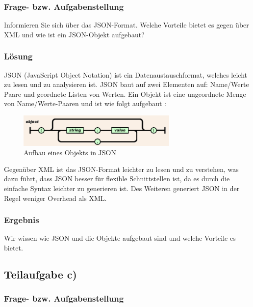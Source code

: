 \subsubsection{Frage- bzw. Aufgabenstellung}

Informieren Sie sich über das JSON-Format. Welche Vorteile bietet es gegen über XML und wie ist ein JSON-Objekt aufgebaut?

\subsubsection{Lösung}

JSON (JavaScript Object Notation) ist ein Datenaustauschformat, welches leicht zu lesen und zu analysieren ist. JSON baut auf zwei Elementen auf: Name/Werte Paare und geordnete Listen von Werten. 
Ein Objekt ist eine ungeordnete Menge von Name/Werte-Paaren und ist wie folgt aufgebaut : \cite{[1]}
\begin{figure}[htbp]
\begin{center}
\includegraphics[width=0.7\textwidth]{JSONObject}
\caption{Aufbau eines Objekts in JSON}
\end{center}
\end{figure}

Gegenüber XML ist das JSON-Format leichter zu lesen und zu verstehen, was dazu führt, dass JSON besser für flexible Schnittstellen ist, da es durch die einfache Syntax leichter zu generieren ist. Des Weiteren generiert JSON in der Regel weniger Overhead als XML. \cite{[2]}

\subsubsection{Ergebnis}

Wir wissen wie JSON und die Objekte aufgebaut sind und welche Vorteile es bietet.

\subsection{Teilaufgabe c)}

\subsubsection{Frage- bzw. Aufgabenstellung}

